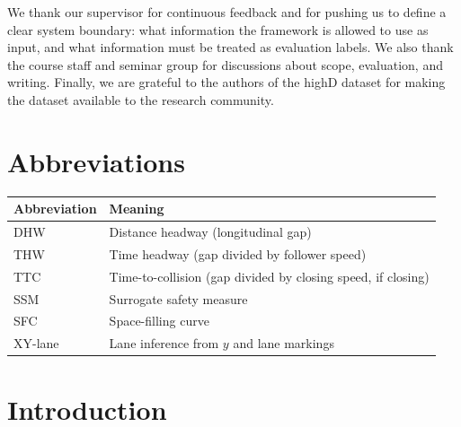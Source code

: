 \documentclass[12pt,a4paper,twoside,openright]{report}
\begin{document}
    We thank our supervisor for continuous feedback and for pushing us to define a clear system boundary: what information the framework is allowed to use as input, and what information must be treated as evaluation labels. We also thank the course staff and seminar group for discussions about scope, evaluation, and writing. Finally, we are grateful to the authors of the highD dataset for making the dataset available to the research community.

    \cleardoublepage
    \tableofcontents

    \cleardoublepage
    \listoffigures

    \cleardoublepage
    \listoftables

    \cleardoublepage
    \chapter*{Abbreviations}

    \begin{tabular}{@{}ll@{}}
        \toprule
        Abbreviation & Meaning \\
        \midrule
        DHW & Distance headway (longitudinal gap) \\
        THW & Time headway (gap divided by follower speed) \\
        TTC & Time-to-collision (gap divided by closing speed, if closing) \\
        SSM & Surrogate safety measure \\
        SFC & Space-filling curve \\
        XY-lane & Lane inference from $y$ and lane markings \\
        \bottomrule
    \end{tabular}

    \cleardoublepage
    \setcounter{page}{1}
    \onehalfspacing

    \chapter{Introduction}
    \label{chap:introduction}
\end{document}
